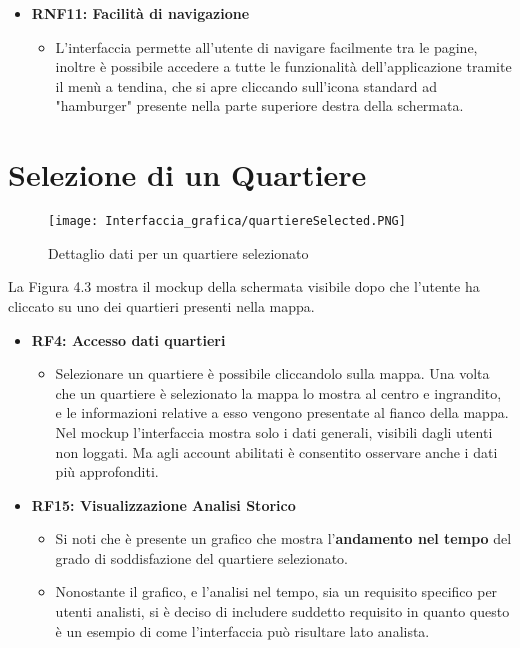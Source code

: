 \begin{itemize}
\begin{itemize}
        \end{itemize}
        \item \textbf{RNF11: Facilità di navigazione} \begin{itemize}
            \item L'interfaccia permette all'utente di navigare facilmente tra le pagine, inoltre è possibile accedere a tutte le funzionalità dell'applicazione tramite il menù a tendina, che si apre cliccando sull'icona standard ad "hamburger" presente nella parte superiore destra della schermata.
            \end{itemize}
    \end{itemize}
\newpage
\section{Selezione di un Quartiere}
    \begin{figure}[H]
        \center
        \texttt{[image: Interfaccia\_grafica/quartiereSelected.PNG]}
        \caption{Dettaglio dati per un quartiere selezionato}
    \end{figure}    

    La Figura 4.3 mostra il mockup della schermata visibile dopo che l'utente ha cliccato su uno dei quartieri presenti nella mappa.

    \begin{itemize}
        \item \textbf{RF4: Accesso dati quartieri} \begin{itemize}
            \item Selezionare un quartiere è possibile cliccandolo sulla mappa. Una volta che un quartiere è selezionato la mappa lo mostra al centro e ingrandito, e le informazioni relative a esso vengono presentate al fianco della mappa. Nel mockup l'interfaccia mostra solo i dati generali, visibili dagli utenti non loggati. Ma agli account abilitati è consentito osservare anche i dati più approfonditi.
        \end{itemize} 
        \item \textbf{RF15: Visualizzazione Analisi Storico} \begin{itemize}
            \item Si noti che è presente un grafico che mostra l'\textbf{andamento nel tempo} del grado di soddisfazione del quartiere selezionato. 
            \item Nonostante il grafico, e l'analisi nel tempo, sia un requisito specifico per utenti analisti, si è deciso di includere suddetto requisito in quanto questo è un esempio di come l'interfaccia può risultare lato analista.
        \end{itemize}
    \end{itemize}
